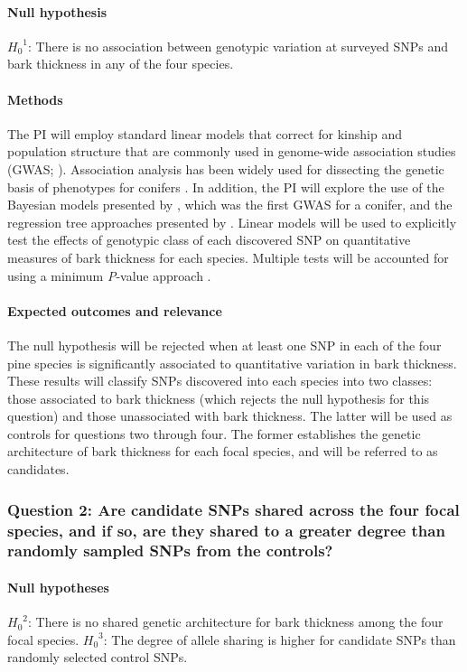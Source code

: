\paragraph{Null hypothesis} ${H_0}^1$: There is no association between genotypic variation at surveyed SNPs and bark thickness 
in any of the four species.

\paragraph{Methods} The PI will employ standard linear models that correct for kinship and population structure that are 
commonly used in genome-wide association studies (GWAS; \citet{Yu:2006ij}). Association analysis has been widely 
used for dissecting the genetic basis of phenotypes for conifers \citep{Neale:2011jh, Ingvarsson:2011fg}. 
In addition, the PI will explore the use of the Bayesian models presented by \citet{Parchman:2012ca}, which 
was the first GWAS for a conifer, and the regression tree approaches presented by \citet{Holliday:2012fz}. 
Linear models will be used to explicitly test the effects of genotypic class of each discovered SNP on quantitative 
measures of bark thickness for each species.  Multiple tests will be accounted for using a minimum \emph{P}-value approach 
\citep{Conneely:2007ga}.

\paragraph{Expected outcomes and relevance} The null hypothesis will be rejected when at least one SNP in each 
of the four pine species is significantly associated to quantitative variation in bark thickness. These results will classify 
SNPs discovered into each species into two classes: those associated to bark thickness 
(which rejects the null hypothesis for this question) and those unassociated with 
bark thickness. The latter will be used as controls for questions two through four. The former establishes the 
genetic architecture of bark thickness for each focal species, and will be referred to as candidates.

\subsubsection*{Question 2: Are candidate SNPs shared across the four focal species, and if so, are they shared to a 
greater degree than randomly sampled SNPs from the controls?}

\paragraph{Null hypotheses}  ${H_0}^2$: There is no shared genetic architecture for bark thickness among 
the four focal species. ${H_0}^3$: The degree of allele sharing is higher for candidate SNPs than randomly 
selected control SNPs.

